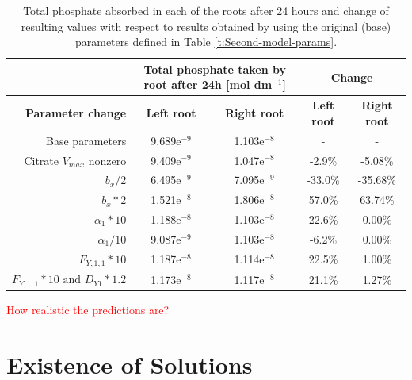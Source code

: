 \documentclass[11pt]{article}
\numberwithin{equation}{section}
\begin{document}
\begin{table}[h]
\begin{center}

\fontsize{9.5}{7}\selectfont
\setlength{\tabcolsep}{5.pt}
\def\arraystretch{2.0}
\begin{tabular}{rcccc}
\toprule
 & \multicolumn{2}{c}{\textbf{Total phosphate taken by root after 24h [mol dm$^{-1}$]}} & \multicolumn{2}{c}{\textbf{Change}} \\
 \hline
  \textbf{Parameter change} & \textbf{Left root} & \textbf{Right root} & \textbf{Left root}  & \textbf{Right root}\\
 \hline 
Base parameters & 9.689e$^{-9}$ &  1.103e$^{-8}$& - &- \\
Citrate $V_{max}$ nonzero     & 9.409e$^{-9}$ & 1.047e$^{-8}$ & -2.9\% & -5.08\%\\
$b_x / 2$                     & 6.495e$^{-9}$ & 7.095e$^{-9}$ & -33.0\% & -35.68\%\\
$b_x * 2$                     & 1.521e$^{-8}$ & 1.806e$^{-8}$ & 57.0\% & 63.74\% \\
$\alpha_1 * 10$                & 1.188e$^{-8}$ & 1.103e$^{-8}$ & 22.6\% & 0.00\% \\
$\alpha_1 / 10$                & 9.087e$^{-9}$ & 1.103e$^{-8}$ & -6.2\% & 0.00\% \\
$F_{Y,1,1}*10$                & 1.187e$^{-8}$ & 1.114e$^{-8}$ & 22.5\% & 1.00\% \\
$F_{Y,1,1}*10\text{ and } D_{Y1}*1.2$ & 1.173e$^{-8}$ & 1.117e$^{-8}$ & 21.1\% & 1.27\%   \\
\bottomrule
\end{tabular}
\caption{Total phosphate absorbed in each of the roots after 24 hours and change of resulting values with respect to results obtained by using the original (base) parameters defined in Table \ref{t:Second-model-params}.}
\end{center}
\end{table}



\textcolor{red}{How realistic the predictions are?}
\newpage
\clearpage

\newpage
\section{Existence of Solutions}
\label{sec:Existence}
\end{document}
